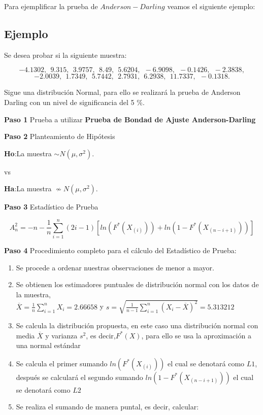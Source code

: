 \documentclass[a4paper,oneside,openany]{book}
\begin{document}
Para ejemplificar la prueba de \(Anderson-Darling\) veamos el siguiente
ejemplo:

\subsection{Ejemplo}\label{ejemplo-15}

Se desea probar si la siguiente muestra:

\[-4.1302,\ \ 9.315,\ \ 3.9757,\ \ 8.49,\ \ 5.6204,\ \ -6.9098,\ \ -0.1426,\ \ -2.3838,\]
\[-2.0039,\ \ 1.7349,\ \ 5.7442,\ \ 2.7931,\ \ 6.2938,\ \ 11.7337,\ \ -0.1318.\]

Sigue una distribución Normal, para ello se realizará la prueba de
Anderson Darling con un nivel de significancia del 5 \%.

\textbf{Paso 1} Prueba a utilizar \textbf{Prueba de Bondad de Ajuste
Anderson-Darling}

\textbf{Paso 2} Planteamiento de Hipótesis

\textbf{Ho}:La muestra \(\sim N(\mu,\sigma^2)\).

vs

\textbf{Ha}:La muestra \(\nsim N(\mu,\sigma^2)\).

\textbf{Paso 3} Estadístico de Prueba

\[A_n^2=-n-\frac{1}{n}\sum_{i=1}^{n}\left(2i-1\right)[ln(F^*(X_{(i)})) +ln(1-F^*(X_{(n-i+1)}))]\]

\textbf{Paso 4} Procedimiento completo para el cálculo del Estadístico
de Prueba:

\begin{enumerate}
\def\labelenumi{\arabic{enumi})}
\item
  Se procede a ordenar nuestras observaciones de menor a mayor.
\item
  Se obtienen los estimadores puntuales de distribución normal con los
  datos de la muestra,\\
  \(\overline{X}=\frac{1}{n}\sum_{i=1}^{n}X_{i}= 2.66658\) y
  \(s=\sqrt{\frac{1}{n-1}\sum_{i=1}^{n}(X_{i}-\overline{X})^2}=5.313212\)
\item
  Se calcula la distribución propuesta, en este caso una distribución
  normal con media \(\overline{X}\) y varianza \(s^2\), es
  decir,\(F^*(X)\), para ello se usa la aproximación a una normal
  estándar
\item
  Se calcula el primer sumando \(ln(F^*(X_{(i)}))\) el cual se denotará
  como \(L1\), después se calculará el segundo sumando
  \(ln(1-F^*(X_{(n-i+1)}))\) el cual se denotará como \(L2\)
\item
  Se realiza el sumando de manera puntal, es decir, calcular:
\end{enumerate}
\end{document}

